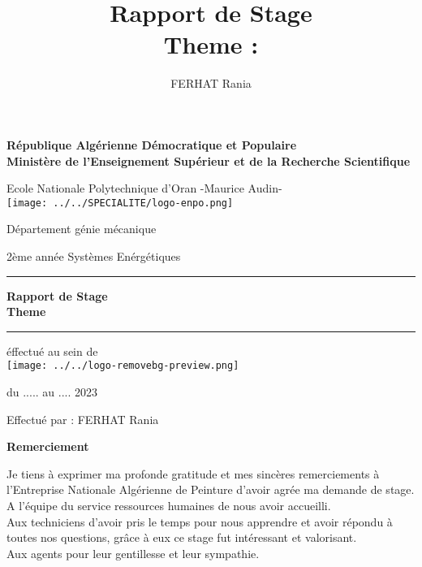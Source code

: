 \documentclass[20pt,a4paper]{report}
\title{ Rapport de Stage \\ Theme : }
\author{FERHAT Rania}
\date{}
\begin{document}
\begin{titlepage}
\begin{center}
\large{\textbf{République Algérienne Démocratique et Populaire \\
Ministère de l’Enseignement Supérieur et de la Recherche Scientifique \\}}

\vspace{1cm}
Ecole Nationale Polytechnique d'Oran -Maurice Audin- \\

\texttt{[image: ../../SPECIALITE/logo-enpo.png]} 

Département génie mécanique

2ème année Systèmes Enérgétiques
\vspace{2cm}
\hrule
\vspace{1cm}
\LARGE{\textbf{Rapport de Stage\\ Theme}}
\vspace{1cm}
\hrule
\vspace{2cm}
éffectué au sein de \\

\texttt{[image: ../../logo-removebg-preview.png]} 

du ..... au .... 2023

\vspace{3cm}
Effectué par : FERHAT Rania
\end{center}
\end{titlepage}
	
\begin{center}
\textbf{{\LARGE Remerciement}}
\end{center}


\begin{center}
\begin{LARGE}
Je tiens à exprimer ma profonde gratitude et mes sincères remerciements à l’Entreprise Nationale Algérienne de Peinture d’avoir agrée ma demande de stage.
\\
A l’équipe du service ressources humaines de nous avoir accueilli.
\\
Aux techniciens d’avoir pris le temps pour nous apprendre et avoir répondu à toutes nos questions, grâce à eux ce stage fut intéressant et valorisant.
\\

Aux agents pour leur gentillesse et leur sympathie.
\end{LARGE}
\end{center}
\end{document}

